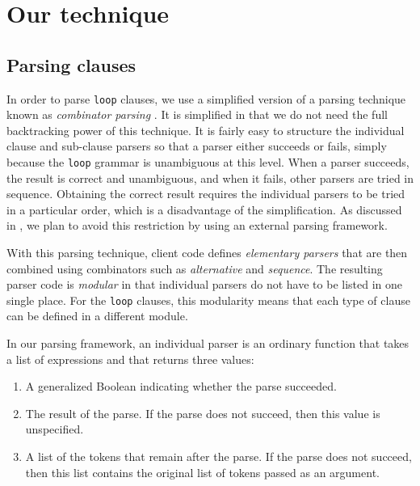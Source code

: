 \section{Our technique}
\label{sec-our-technique}

\subsection{Parsing clauses}
\label{sec-our-technique-parsing-clauses}

In order to parse \texttt{loop} clauses, we use a simplified version%
of a parsing technique known as \emph{combinator parsing}
\cite{Wadler:1985:RFL:5280.5288}.  It is simplified in that we do not
need the full backtracking power of this technique.  It is fairly easy
to structure the individual clause and sub-clause parsers so that a
parser either succeeds or fails, simply because the \texttt{loop}
grammar is unambiguous at this level.  When a parser succeeds, the
result is correct and unambiguous, and when it fails, other parsers
are tried in sequence.  Obtaining the correct result requires the
individual parsers to be tried in a particular order, which is a
disadvantage of the simplification.  As discussed in
, we plan to avoid this
restriction by using an external parsing framework.

With this parsing technique, client code defines \emph{elementary
  parsers} that are then combined using combinators such as
\emph{alternative} and \emph{sequence}.  The resulting parser code is
\emph{modular} in that individual parsers do not have to be listed in
one single place.  For the \texttt{loop} clauses, this modularity
means that each type of clause can be defined in a different module.

In our parsing framework, an individual parser is an ordinary
\commonlisp{} function that takes a list of \commonlisp{} expressions
and that returns three values:

\begin{enumerate}
\item A generalized Boolean indicating whether the parse succeeded.
\item The result of the parse.  If the parse does not succeed, then
  this value is unspecified.
\item A list of the tokens that remain after the parse.  If the
  parse does not succeed, then this list contains the original
  list of tokens passed as an argument.
\end{enumerate}

